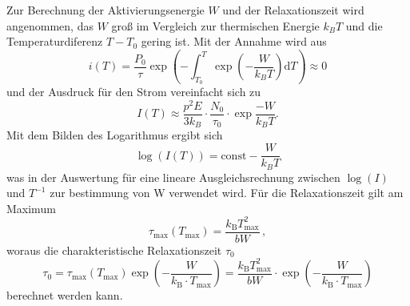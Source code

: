 Zur Berechnung der Aktivierungsenergie $W$ und der Relaxationszeit wird angenommen,
das $W$ groß im Vergleich zur thermischen Energie $k_B T$
und die Temperaturdiferenz $T - T_0$ gering ist.
Mit der Annahme wird aus 
\begin{equation}
    i(T) = \frac{P_0}{\tau} \exp\!\left(-\int_{T_0}^T
      \exp\!\left(- \frac{W}{k_B T}\right) \text{d}{T}\right) \approx 0
\end{equation}
und der Ausdruck für den Strom vereinfacht sich zu 
\begin{equation}
    I(T) \approx \frac{p^2E}{3k_B}\cdot\frac{N_0}{\tau_0}\cdot\exp{\frac{-W}{k_B T}}.
\end{equation}
Mit dem Bilden des Logarithmus ergibt sich
\begin{equation}
    \log(I(T)) = \text{const} -\frac{W}{k_B T}
    \label{eq:W1}
\end{equation}
was in der Auswertung für eine lineare Ausgleichsrechnung zwischen $\log(I)$
und $T^{-1}$ zur bestimmung von W verwendet wird.
Für die Relaxationszeit gilt am Maximum 
\begin{equation}
    \tau_{\text{max}} (T_{\text{max}}) = \frac{k_\text{B} T^2_{\text{max}}}{b W}\, ,
\end{equation}
woraus die charakteristische Relaxationszeit $\tau_0$ 
\begin{equation}
    \tau_0 = \tau_{\text{max}} (T_{\text{max}}) \exp \left(- \frac{W}{k_{\text{B}} \cdot T_\text{max}}\right) = \frac{k_\text{B} T^2_{\text{max}}}{b W} \cdot\exp \left(- \frac{W}{k_{\text{B}} \cdot T_\text{max}}\right)
    \label{eq:relax}
\end{equation}
berechnet werden kann.


